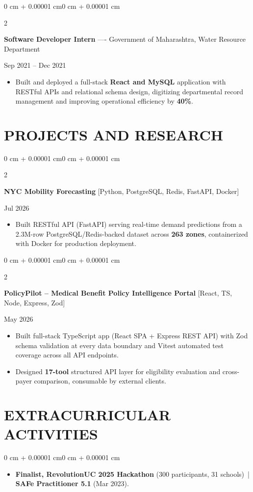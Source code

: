 \documentclass[10pt, letterpaper]{article}
\newenvironment{highlights}{
    \begin{itemize}[
        topsep=0.10 cm,
        parsep=0.06 cm,
        partopsep=0pt,
        itemsep=0.06 cm,
        leftmargin=12pt
    ]
}{
    \end{itemize}
}
\newenvironment{onecolentry}{
    \begin{adjustwidth}{0 cm + 0.00001 cm}{0 cm + 0.00001 cm}
}{
    \end{adjustwidth}
}
\newenvironment{twocolentry}[2][]{
    \onecolentry
    \def\secondColumn{#2}
    \setcolumnwidth{\fill, 4.5 cm}
    \begin{paracol}{2}
}{
    \switchcolumn \raggedleft \secondColumn
    \end{paracol}
    \endonecolentry
}
\begin{document}
\vspace{0.15 cm}

\begin{twocolentry}{Sep 2021 -- Dec 2021}
\textbf{Software Developer Intern} ---- Government of Maharashtra, Water Resource Department
\end{twocolentry}
\begin{highlights}
  \item Built and deployed a full-stack \textbf{React and MySQL} application with RESTful APIs and relational schema design, digitizing departmental record management and improving operational efficiency by \textbf{40\%}.
\end{highlights}

\section{PROJECTS AND RESEARCH}
\begin{twocolentry}{Jul 2026}
\textbf{NYC Mobility Forecasting} [Python, PostgreSQL, Redis, FastAPI, Docker]
\end{twocolentry}
\begin{highlights}
  \item Built RESTful API (FastAPI) serving real-time demand predictions from a 2.3M-row PostgreSQL/Redis-backed dataset across \textbf{263 zones}, containerized with Docker for production deployment.
\end{highlights}

\vspace{0.12 cm}

\begin{twocolentry}{May 2026}
\textbf{PolicyPilot -- Medical Benefit Policy Intelligence Portal} [React, TS, Node, Express, Zod]
\end{twocolentry}
\begin{highlights}
  \item Built full-stack TypeScript app (React SPA + Express REST API) with Zod schema validation at every data boundary and Vitest automated test coverage across all API endpoints.
  \item Designed \textbf{17-tool} structured API layer for eligibility evaluation and cross-payer comparison, consumable by external clients.
\end{highlights}

\section{EXTRACURRICULAR ACTIVITIES}
\begin{onecolentry}
\begin{highlights}
  \item \textbf{Finalist, RevolutionUC 2025 Hackathon} (300 participants, 31 schools) \,|\, \textbf{SAFe Practitioner 5.1} (Mar 2023).
\end{highlights}
\end{onecolentry}
\end{document}
